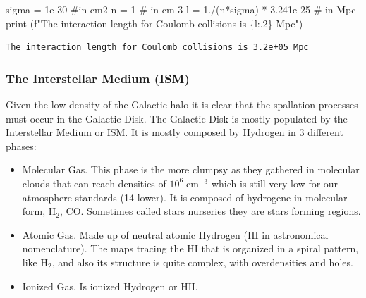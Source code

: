 \documentclass[
  letterpaper,
  DIV=11,
  numbers=noendperiod]{scrreprt}
\newenvironment{Shaded}{\begin{snugshade}}{\end{snugshade}}
\newcommand{\BuiltInTok}[1]{\textcolor[rgb]{0.00,0.23,0.31}{#1}}
\newcommand{\CommentTok}[1]{\textcolor[rgb]{0.37,0.37,0.37}{#1}}
\newcommand{\DecValTok}[1]{\textcolor[rgb]{0.68,0.00,0.00}{#1}}
\newcommand{\FloatTok}[1]{\textcolor[rgb]{0.68,0.00,0.00}{#1}}
\newcommand{\NormalTok}[1]{\textcolor[rgb]{0.00,0.23,0.31}{#1}}
\newcommand{\OperatorTok}[1]{\textcolor[rgb]{0.37,0.37,0.37}{#1}}
\newcommand{\SpecialCharTok}[1]{\textcolor[rgb]{0.37,0.37,0.37}{#1}}
\newcommand{\SpecialStringTok}[1]{\textcolor[rgb]{0.13,0.47,0.30}{#1}}
\begin{document}
\begin{Shaded}
\begin{Highlighting}[]
\NormalTok{sigma }\OperatorTok{=} \FloatTok{1e{-}30} \CommentTok{\#in cm2}
\NormalTok{n }\OperatorTok{=} \DecValTok{1} \CommentTok{\# in cm{-}3}
\NormalTok{l }\OperatorTok{=} \FloatTok{1.}\OperatorTok{/}\NormalTok{(n}\OperatorTok{*}\NormalTok{sigma) }\OperatorTok{*} \FloatTok{3.241e{-}25} \CommentTok{\# in Mpc}
\BuiltInTok{print}\NormalTok{ (}\SpecialStringTok{f"The interaction length for Coulomb collisions is }\SpecialCharTok{\{}\NormalTok{l}\SpecialCharTok{:.2\}}\SpecialStringTok{ Mpc"}\NormalTok{)}
\end{Highlighting}
\end{Shaded}

\begin{verbatim}
The interaction length for Coulomb collisions is 3.2e+05 Mpc
\end{verbatim}

\subsubsection*{The Interstellar Medium
(ISM)}\label{the-interstellar-medium-ism}

Given the low density of the Galactic halo it is clear that the
spallation processes must occur in the Galactic Disk. The Galactic Disk
is mostly populated by the Interstellar Medium or ISM. It is mostly
composed by Hydrogen in 3 different phases:

\begin{itemize}
\item
  Molecular Gas. This phase is the more clumpsy as they gathered in
  molecular clouds that can reach densities of
  \(10^{6} \; \mathrm{cm}^{-3}\) which is still very low for our
  atmosphere standards (14 lower). It is composed of hydrogene in
  molecular form, \(\mathrm{H}_2\), \(\mathrm{CO}\). Sometimes called
  stars nurseries they are stars forming regions.
\item
  Atomic Gas. Made up of neutral atomic Hydrogen (HI in astronomical
  nomenclature). The maps tracing the \(\mathrm{HI}\) that is organized
  in a spiral pattern, like \(\mathrm{H}_2\), and also its structure is
  quite complex, with overdensities and holes.
\item
  Ionized Gas. Is ionized Hydrogen or \(\mathrm{HII}\).
\end{itemize}
\end{document}
